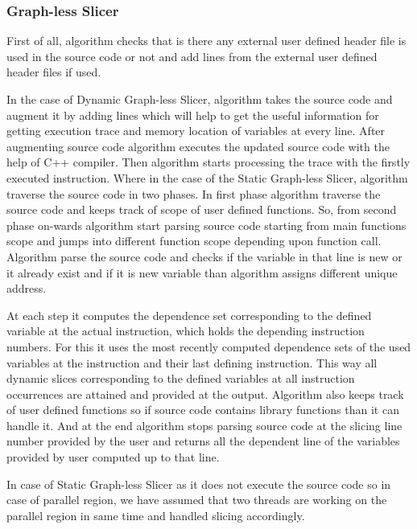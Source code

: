 \documentclass[conference]{IEEEtran}
\begin{document}
\subsubsection{Graph-less Slicer}
\par First of all, algorithm checks that is there any external user defined header file is used in the source code or not and add lines from the external user defined header files if used. 
\par In the case of Dynamic Graph-less Slicer, algorithm takes the source code and augment it by adding lines which will help to get the useful information for getting execution trace and memory location of variables at every line. After augmenting source code algorithm executes the updated source code with the help of C++ compiler. Then algorithm starts processing the trace with the ﬁrstly executed instruction. Where in the case of the Static Graph-less Slicer, algorithm traverse the source code in two phases. In first phase algorithm traverse the source code and keeps track of scope of user defined functions. So, from second phase on-wards algorithm start parsing source code starting from main functions scope and jumps into different function scope depending upon function call. Algorithm parse the source code and checks if the variable in that line is new or it already exist and if it is new variable than algorithm assigns different unique address. 

\par At each step it computes the dependence set corresponding to the deﬁned variable at the actual instruction, which holds the depending instruction numbers. For this it uses the most recently computed dependence sets of the used variables at the instruction and their last deﬁning instruction. This way all dynamic slices corresponding to the deﬁned variables at all instruction occurrences are attained and provided at the output. Algorithm also keeps track of user defined functions so if source code contains library functions than it can handle it. And at the end algorithm stops parsing source code at the slicing line number provided by the user and returns all the dependent line of the variables provided by user computed up to that line.
\par In case of Static Graph-less Slicer as it does not execute the source code so in case of parallel region, we have assumed that two threads are working on the parallel region in same time and handled slicing accordingly.
\end{document}
